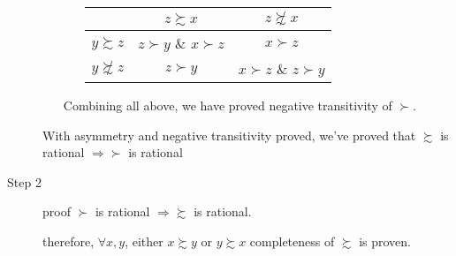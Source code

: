 \begin{description}
\begin{itemize}
\begin{enumerate}
        \begin{table}[h]
        \begin{centering}
        \begin{tabular}{ccc}
        \hline 
         & $z\succsim x$ & $z\not\succsim x$\tabularnewline
        \hline 
        $y\succsim z$ & $z\succ y$ \& $x\succ z$ & $x\succ z$\tabularnewline
        $y\not\succsim z$ & $z\succ y$ & $x\succ z$ \& $z\succ y$\tabularnewline
        \hline 
        \end{tabular}
        \par\end{centering}
        \end{table}
        
        \end{enumerate}
        Combining all above, we have proved negative transitivity of $\succ$.
        \end{itemize}
        With asymmetry and negative transitivity proved, we've proved that
        $\succsim$ is rational $\Rightarrow$$\succ$ is rational
    
    \item[Step 2] proof $\succ$ is rational $\Rightarrow$$\succsim$ is rational.
    therefore, $\forall x,y$, either $x\succsim y$ or $y\succsim x$ completeness of $\succsim$ is proven.


\end{description}
